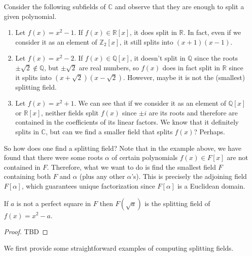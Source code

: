   \begin{example}
    Consider the following subfields of $\mathbb{C}$ and observe that they are enough to split a given polynomial. 
    \begin{enumerate}
      \item Let $f(x) = x^2 - 1$. If $f(x) \in \mathbb{R}[x]$, it does split in $\mathbb{R}$. In fact, even if we consider it as an element of $\mathbb{Z}_2 [x]$, it still splits into $(x + 1)(x - 1)$. 
      \item Let $f(x) = x^2 - 2$. If $f(x) \in \mathbb{Q}[x]$, it doesn't split in $\mathbb{Q}$ since the roots $\pm \sqrt{2} \not\in \mathbb{Q}$, but $\pm \sqrt{2}$ are real numbers, so $f(x)$ does in fact split in $\mathbb{R}$ since it splits into $(x + \sqrt{2}) (x - \sqrt{2})$. However, maybe it is not the (smallest) splitting field. 
      \item Let $f(x) = x^2 + 1$. We can see that if we consider it as an element of $\mathbb{Q}[x]$ or $\mathbb{R}[x]$, neither fields split $f(x)$ since $\pm i$ are its roots and therefore are contained in the coefficients of its linear factors. We know that it definitely splits in $\mathbb{C}$, but can we find a smaller field that splits $f(x)$? Perhaps.  
    \end{enumerate}
  \end{example}

  So how does one find a splitting field? Note that in the example above, we have found that there were some roots $\alpha$ of certain polynomials $f(x) \in F[x]$ are not contained in $F$. Therefore, what we want to do is find the smallest field $F$ containing both $F$ and $\alpha$ (plus any other $\alpha$'s). This is precisely the adjoining field $F[\alpha]$, which guarantees unique factorization since $F[\alpha]$ is a Euclidean domain. 

  \begin{lemma}
    If $a$ is not a perfect square in $F$ then $F(\sqrt{a})$ is the splitting field of $f(x) = x^2 - a$. 
  \end{lemma}
  \begin{proof}
    TBD
  \end{proof}

  We first provide some straightforward examples of computing splitting fields. 

